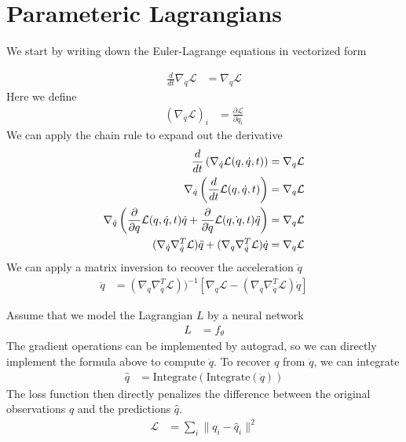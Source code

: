 \documentclass[book.tex]{subfiles}
\begin{document}
\section{Parameteric Lagrangians}

We start by writing down the Euler-Lagrange equations in vectorized form

\begin{align}
    \frac{d}{dt} \nabla_{\dot{q}} \mathcal{L} &= \nabla_q \mathcal{L}
\end{align}
Here we define
\begin{align}
    (\nabla_{\dot{q}} \mathcal{L})_i &= \frac{\partial \mathcal{L}}{\partial \dot{q}_i}
\end{align}
We can apply the chain rule to expand out the derivative %
\begin{align}
\frac{d}{dt} \left ( \nabla_{\dot q} \mathcal{L}(q, \dot q, t) \right ) &= \nabla_q \mathcal{L} \\
\nabla_{\dot q} \left (\frac{d}{dt} \mathcal{L}(q, \dot q, t) \right ) &= \nabla_q \mathcal{L} \\
\nabla_{\dot q} \left ( \frac{\partial}{\partial q} \mathcal{L}(q, \dot q, t) \dot q + \frac{\partial}{\partial \dot q} \mathcal{L}(q, \dot q, t) \Ddot{q}  \right ) &= \nabla_q \mathcal{L} \\
(\nabla_{\dot{q}} \nabla_{\dot{q}}^T \mathcal{L}) \ddot{q} + (\nabla_q \nabla_{\dot{q}}^T \mathcal{L}) \dot{q}  &= \nabla_q \mathcal{L}
\end{align}
We can apply a matrix inversion to recover the acceleration $\ddot{q}$
\begin{align}
    \ddot{q} &= (\nabla_{\dot{q}} \nabla_{\dot{q}}^T \mathcal{L})) ^{-1} [\nabla_q \mathcal{L} - (\nabla_q \nabla_{\dot{q}}^T \mathcal{L})\dot{q}  ]
\end{align}

Assume that we model the Lagrangian $L$ by a neural network
\begin{align}
L &= f_\theta
\end{align}
The gradient operations can be implemented by autograd, so we can directly implement the formula above to compute $\ddot{q}$. To recover $q$ from $\ddot{q}$, we can integrate
\begin{align}
\hat{q} &= \mathrm{Integrate}(\mathrm{Integrate}(\ddot{q}))
\end{align}
The loss function then directly penalizes the difference between the original observations $q$ and the predictions $\hat{q}$.
\begin{align}
\mathcal{L} &= \sum_i \|q_i - \hat{q}_i\|^2
\end{align}
\end{document}
